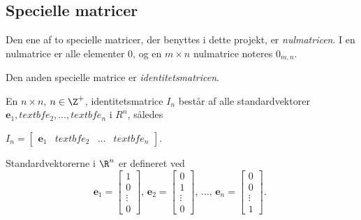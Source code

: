\subsection{Specielle matricer} %

Den ene af to specielle matricer, der benyttes i dette projekt, er \textit{nulmatricen}. I en nulmatrice er alle elementer $0$, og en $m \times n$ nulmatrice noteres $0_{m,n}$. 

Den anden specielle matrice er \textit{identitetsmatricen}. 

\begin{defn}{}{}
En $n \times n$, $n \in \Z^+$, identitetsmatrice $I_n$ består af alle standardvektorer $\textbf{e}_1, textbf{e}_2, \ldots, textbf{e}_n$ i $R^n$, således 

$
I_n=
\begin{bmatrix}
\textbf{e}_1 & textbf{e}_2 & \ldots & textbf{e}_n
\end{bmatrix}
$. 

\end{defn}

Standardvektorerne i $\R^n$ er defineret ved 
$$
\textbf{e}_1=
\begin{bmatrix}
1 \\ 
0 \\ 
\vdots \\
0
\end{bmatrix}
\text{, }
\textbf{e}_2=
\begin{bmatrix}
0 \\ 
1 \\ 
\vdots \\
0
\end{bmatrix}
\text{, }
\ldots
\text{, }
\textbf{e}_n=
\begin{bmatrix}
0 \\ 
0 \\ 
\vdots \\
1
\end{bmatrix}
\text{. }
$$


